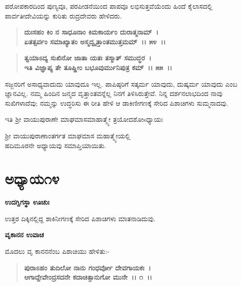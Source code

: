 ಪರೋಪಕಾರದಿಂದ ಪುಣ್ಯವೂ, ಪರಪೀಡನೆಯಿಂದ ಪಾಪವೂ ಲಭಿಸುತ್ತವೆಯೆಂದು ಹಿಂದೆ ಕೈಲಾಸದಲ್ಲಿ ಪಾರ್ವತೀದೇವಿಯನ್ನು ಕುರಿತು ರುದ್ರದೇವರು ಹೇಳಿದರು.

\begin{verse}
\textbf{ದುಃಸಹಂ ಕಿಂ ನ ಸಾಧೂನಾಂ ಕಿಮಕಾರ್ಯಂ ದುರಾತ್ಮನಾಮ್~।}\\\textbf{ಏತತ್ಸರ್ವಂ ಸಮಾಖ್ಯಾತಂ ಅಸ್ಮದ್ವೃತ್ತಾಂತಮುತ್ತಮಮ್~।। ೫೪~।। }
\end{verse}

\begin{verse}
\textbf{ತ್ವಯಾಽದ್ಯ ಸುಖಿನೋ ಜಾತಾ ಯತಃ ತಸ್ಮಾತ್ ಸಮುದ್ಧರ~।}\\\textbf{ಇತಿ ವಿಜ್ಞಾಪ್ಯ ತೇ ತೂಷ್ಣೀಂ ಬಭೂವುರ್ಮುನಿಪುತ್ರ ಕಮ್~।। ೫೫~।।}
\end{verse}

ಸಜ್ಜನರಿಗೆ ಅಸಾಧ್ಯವಾದುದು ಯಾವುದೂ ಇಲ್ಲ. ಪಾಪಿಷ್ಠರಿಗೆ ಸತ್ಕರ್ಮ ಯಾವುದು, ದುಷ್ಕರ್ಮ ಯಾವುದು ಎಂಬ ಜ್ಞಾನವಿಲ್ಲ. ನಮ್ಮ ಹಿಂದಿನ ಜನ್ಮದ ವೃತ್ತಾಂತವನ್ನೆಲ್ಲ ನಿನಗೆ ತಿಳಿಸಿರುತ್ತೇವೆ. ನಿನ್ನ ದರ್ಶನಲಾಭದಿಂದ ನಾವು ಸುಖಿಗಳಾದೆವು; ನಮ್ಮನ್ನು ಉದ್ಧರಿಸು ಈ ರೀತಿ ಹೇಳಿ ಆ ಡಾಕಿಣೀಗಣಕ್ಕೆ ಸೇರಿದ ಪಿಶಾಚಿಗಳು ಸುಮ್ಮನಾದವು.

\begin{center}
ಇತಿ ಶ‍್ರೀ ವಾಯುಪುರಾಣೇ ಮಾಘಮಾಸಮಾಹಾತ್ಮ್ಯೇ ತ್ರಯೋದಶೋsಧ್ಯಾಯಃ 
\end{center}

\begin{center}
ಶ‍್ರೀ ವಾಯುಪುರಾಣಾಂತರ್ಗತ ಮಾಘಮಾಸ ಮಹಾತ್ಮ್ಯೇಯಲ್ಲಿ\\ ಹದಿಮೂರನೇ ಅಧ್ಯಾಯವು ಸಮಾಪ್ತಿಯಾಯಿತು.
\end{center}

\newpage

\section*{ಅಧ್ಯಾಯ\enginline{-}೧೪}

\emptypage

\begin{flushleft}
\textbf{ಉದಗ್ದಿಗಸ್ಥಾ ಊಚುಃ\enginline{-}}
\end{flushleft}

ಉತ್ತರ ದಿಕ್ಕಿನಲ್ಲಿದ್ದ ಶಾಕಿನೀಗಣಕ್ಕೆ ಸೇರಿದ ಪಿಶಾಚಿಗಳು ಮಾತನಾಡಿದುವು.

\begin{flushleft}
\textbf{ವೃಕಾನನ ಉವಾಚ\enginline{-}}
\end{flushleft}

ಮೊದಲು ವೃ ಕಾನನನೆಂಬ ಪಿಶಾಚಿಯು ಹೇಳಿತು:-

\begin{verse}
\textbf{ಪುರಾಽಹಂ ತುದಿಲೋ ನಾನು ಗಂಧರ್ವೋ ದೇವಗಾಯಕಃ~।}\\\textbf{ಆಗಾದ್ದೇವೇಂದ್ರಸದನೇ ಕದಾಚಿತ್ಸಾನುಗೋ ಮುನೇ~।। ೧~।। }
\end{verse}


